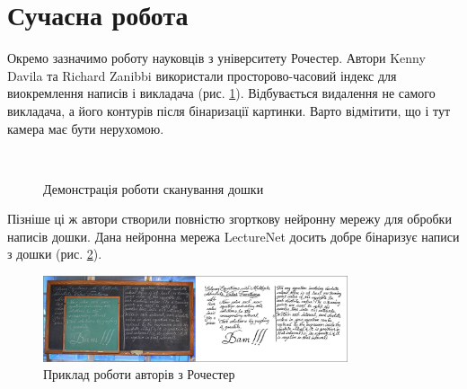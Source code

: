 \section{Сучасна робота}
Окремо зазначимо роботу \cite{davila:2017}
науковців з університету Рочестер. Автори Kenny Davila та Richard Zanibbi
використали просторово-часовий індекс для виокремлення написів і викладача (рис. \ref{fig:davila:2017}).
Відбувається видалення не самого викладача,  а його контурів після бінаризації картинки.
Варто відмітити, що і тут камера має бути нерухомою.
\begin{figure}[H]
  \centering
  \\
  \caption{Демонстрація роботи сканування дошки \cite{davila:2017}
    \label{fig:davila:2017}
  }
\end{figure}
Пізніше ці ж автори створили повністю згорткову нейронну мережу \cite{davila:2021}
для обробки написів дошки. Дана нейронна мережа LectureNet досить добре бінаризує написи з дошки
(рис. \ref{fig:davila:2021}).
\begin{figure}[H]
  \centering
  \includegraphics[width=0.8\textwidth]{images/davila_2021}
  \caption{Приклад роботи авторів з Рочестер}
  \label{fig:davila:2021}
\end{figure}

\clearpage
